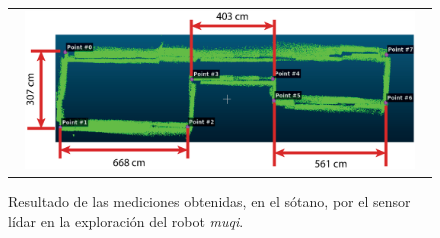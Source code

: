 \begin{figure}
  \centering
  \begin{tabular}{c}
    \includegraphics[width=0.95\textwidth]{images/2d_pointcloud.eps}\\
  \end{tabular}
  \captionsetup{font=footnotesize}
    \caption{\label{fig:Medida3DSotano}Resultado de las mediciones obtenidas, en 
    el sótano, por el sensor lídar en la exploración del robot \textit{muqi}.}
\end{figure}

